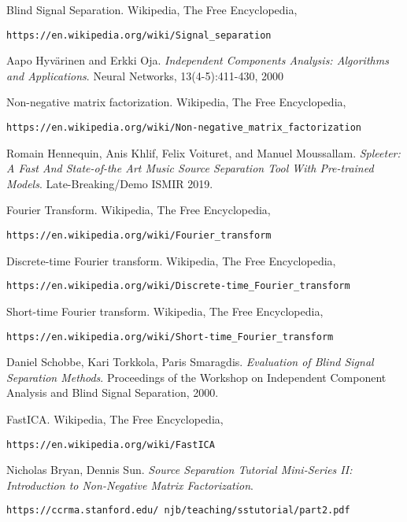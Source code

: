 \documentclass[a4paper,12pt]{article}
\begin{document}
\begin{thebibliography}{9}
Blind Signal Separation. Wikipedia, The Free Encyclopedia,
 
\texttt{https://en.wikipedia.org/wiki/Signal\_separation}

Aapo Hyvärinen and Erkki Oja. \textit{Independent Components Analysis: Algorithms and Applications}. Neural Networks, 13(4-5):411-430, 2000

Non-negative matrix factorization. Wikipedia, The Free Encyclopedia,

\texttt{https://en.wikipedia.org/wiki/Non-negative\_matrix\_factorization}

Romain Hennequin, Anis Khlif, Felix Voituret, and Manuel Moussallam. \textit{Spleeter: A Fast And State-of-the Art Music Source Separation Tool With Pre-trained Models}. Late-Breaking/Demo ISMIR 2019.

Fourier Transform. Wikipedia, The Free Encyclopedia,

\texttt{https://en.wikipedia.org/wiki/Fourier\_transform}

Discrete-time Fourier transform. Wikipedia, The Free Encyclopedia,

\texttt{https://en.wikipedia.org/wiki/Discrete-time\_Fourier\_transform}

Short-time Fourier transform. Wikipedia, The Free Encyclopedia,

\texttt{https://en.wikipedia.org/wiki/Short-time\_Fourier\_transform}

Daniel Schobbe, Kari Torkkola, Paris Smaragdis. \textit{Evaluation of Blind Signal Separation Methods}. Proceedings of the Workshop on Independent Component Analysis and Blind Signal Separation, 2000.

FastICA. Wikipedia, The Free Encyclopedia,

\texttt{https://en.wikipedia.org/wiki/FastICA}

Nicholas Bryan, Dennis Sun. \textit{Source Separation Tutorial Mini-Series II: Introduction to Non-Negative Matrix Factorization}.

\texttt{https://ccrma.stanford.edu/~njb/teaching/sstutorial/part2.pdf}

\end{thebibliography}
\end{document}
